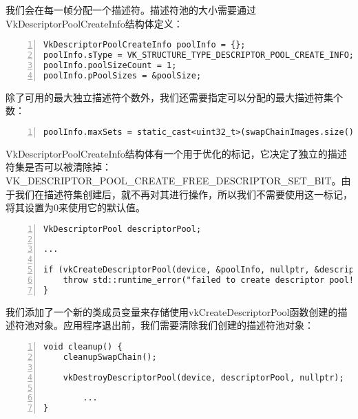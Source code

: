 \documentclass{ctexart}
\begin{document}
我们会在每一帧分配一个描述符。描述符池的大小需要通过VkDescriptorPoolCreateInfo结构体定义：

\begin{lstlisting}[language={[ANSI]C},keywordstyle=\color{blue!70},commentstyle=\color{red!50!green!50!blue!50},frame=shadowbox, rulesepcolor=\color{red!20!green!20!blue!20},basicstyle=\small,numbers=left, numberstyle=\tiny,breaklines=true]
VkDescriptorPoolCreateInfo poolInfo = {};
poolInfo.sType = VK_STRUCTURE_TYPE_DESCRIPTOR_POOL_CREATE_INFO;
poolInfo.poolSizeCount = 1;
poolInfo.pPoolSizes = &poolSize;
\end{lstlisting}

除了可用的最大独立描述符个数外，我们还需要指定可以分配的最大描述符集个数：

\begin{lstlisting}[language={[ANSI]C},keywordstyle=\color{blue!70},commentstyle=\color{red!50!green!50!blue!50},frame=shadowbox, rulesepcolor=\color{red!20!green!20!blue!20},basicstyle=\small,numbers=left, numberstyle=\tiny,breaklines=true]
poolInfo.maxSets = static_cast<uint32_t>(swapChainImages.size());
\end{lstlisting}

VkDescriptorPoolCreateInfo结构体有一个用于优化的标记，它决定了独立的描述符集是否可以被清除掉：VK\_DESCRIPTOR\_POOL\_CREATE\_FREE\_DESCRIPTOR\_SET\_BIT。由于我们在描述符集创建后，就不再对其进行操作，所以我们不需要使用这一标记，将其设置为0来使用它的默认值。

\begin{lstlisting}[language={[ANSI]C},keywordstyle=\color{blue!70},commentstyle=\color{red!50!green!50!blue!50},frame=shadowbox, rulesepcolor=\color{red!20!green!20!blue!20},basicstyle=\small,numbers=left, numberstyle=\tiny,breaklines=true]
VkDescriptorPool descriptorPool;

...

if (vkCreateDescriptorPool(device, &poolInfo, nullptr, &descriptorPool) != VK_SUCCESS) {
	throw std::runtime_error("failed to create descriptor pool!");
}
\end{lstlisting}

我们添加了一个新的类成员变量来存储使用vkCreateDescriptorPool函数创建的描述符池对象。应用程序退出前，我们需要清除我们创建的描述符池对象：

\begin{lstlisting}[language={[ANSI]C},keywordstyle=\color{blue!70},commentstyle=\color{red!50!green!50!blue!50},frame=shadowbox, rulesepcolor=\color{red!20!green!20!blue!20},basicstyle=\small,numbers=left, numberstyle=\tiny,breaklines=true]
void cleanup() {
	cleanupSwapChain();

	vkDestroyDescriptorPool(device, descriptorPool, nullptr);

		...
}
\end{lstlisting}
\end{document}
